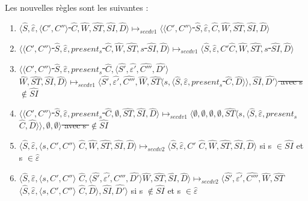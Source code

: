\documentclass[10pt,a4paper]{article}
\begin{document}
				
				Les nouvelles règles sont les suivantes :
				\smallbreak
				\begin{enumerate}
					\item \sout{$\langle\widehat{S},\widehat{\varepsilon},\langle C',C''\rangle$ $\widehat{C},\widehat{W},\widehat{ST},\widehat{SI},\widehat{D}\rangle \longmapsto_{secdv1} \langle\langle C',C''\rangle$ $\widehat{S},\widehat{\varepsilon},\widehat{C},\widehat{W},\widehat{ST},\widehat{SI},\widehat{D}\rangle$}
					\item \sout{$\langle\langle C',C''\rangle $ $\widehat{S},\widehat{\varepsilon},present_{s}$ $\widehat{C},\widehat{W},\widehat{ST},s$ $\widehat{SI},\widehat{D}\rangle \longmapsto_{secdv1} \langle\widehat{S},\widehat{\varepsilon},C'\widehat{C},\widehat{W},\widehat{ST},s$ $\widehat{SI},\widehat{D}\rangle$}
					\item \sout{$\langle\langle C',C''\rangle $ $\widehat{S},\widehat{\varepsilon},present_{s}$ $\widehat{C},\langle\widehat{S'},\widehat{\varepsilon'},\widehat{C'''},\widehat{D'}\rangle$ $\widehat{W},\widehat{ST},\widehat{SI},\widehat{D}\rangle \longmapsto_{secdv1} \langle\widehat{S'},\widehat{\varepsilon'},\widehat{C'''},\widehat{W},\widehat{ST}\langle s,\langle\widehat{S},\widehat{\varepsilon},present_{s}$ $\widehat{C},\widehat{D}\rangle\rangle,\widehat{SI},\widehat{D'}\rangle$ avec s $\notin \widehat{SI}$ }
					\item \sout{$\langle\langle C',C''\rangle $ $\widehat{S},\widehat{\varepsilon},present_{s}$ $\widehat{C},\emptyset,\widehat{ST},\widehat{SI},\widehat{D}\rangle \longmapsto_{secdv1} \langle\emptyset,\emptyset,\emptyset,\emptyset,\widehat{ST}\langle s,\langle\widehat{S},\widehat{\varepsilon},present_{s}$ $\widehat{C},\widehat{D}\rangle\rangle,\emptyset,\emptyset\rangle$ avec s $\notin \widehat{SI}$}
					\item $\langle\widehat{S},\widehat{\varepsilon},\langle s, C',C''\rangle$ $\widehat{C},\widehat{W},\widehat{ST},\widehat{SI},\widehat{D}\rangle \longmapsto_{secdv2} \langle\widehat{S},\widehat{\varepsilon},C'$ $\widehat{C},\widehat{W},\widehat{ST},\widehat{SI},\widehat{D}\rangle$ si s $\in \widehat{SI}$ et s $\in \widehat{\varepsilon}$ 
					\item $\langle\widehat{S},\widehat{\varepsilon},\langle s, C',C''\rangle$ $\widehat{C},\langle\widehat{S'},\widehat{\varepsilon'},C''',\widehat{D'}\rangle\widehat{W},\widehat{ST},\widehat{SI},\widehat{D}\rangle \longmapsto_{secdv2} \langle\widehat{S'},\widehat{\varepsilon'},\widehat{C'''},\widehat{W},\widehat{ST}$ $\langle\widehat{S},\widehat{\varepsilon},\langle s, C',C''\rangle$ $\widehat{C},\widehat{D}\rangle,\widehat{SI},\widehat{D'}\rangle$ si s $\notin \widehat{SI}$ et s $\in \widehat{\varepsilon}$ 

\end{enumerate}
\end{document}
